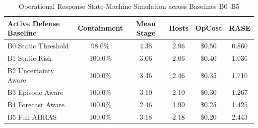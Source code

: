 \begin{table}[t]
\centering
\small
\caption{Operational Response State-Machine Simulation across Baselines B0--B5}
\label{tab:response_safety}
\begin{tabular}{lccccc}
\toprule
\textbf{Active Defense Baseline} & \textbf{Containment} & \textbf{Mean Stage} & \textbf{Hosts} & \textbf{OpCost} & \textbf{RASE} \\
\midrule
B0 Static Threshold & 98.0\% & 4.38 & 2.96 & \$0.50 & 0.860 \\
B1 Static Risk & 100.0\% & 3.06 & 2.06 & \$0.40 & 1.036 \\
B2 Uncertainty Aware & 100.0\% & 3.46 & 2.46 & \$0.35 & 1.710 \\
B3 Episode Aware & 100.0\% & 3.10 & 2.10 & \$0.30 & 1.267 \\
B4 Forecast Aware & 100.0\% & 2.46 & 1.90 & \$0.25 & 1.425 \\
B5 Full AHRAS & 100.0\% & 3.18 & 2.18 & \$0.20 & 2.443 \\
\bottomrule
\end{tabular}
\end{table}